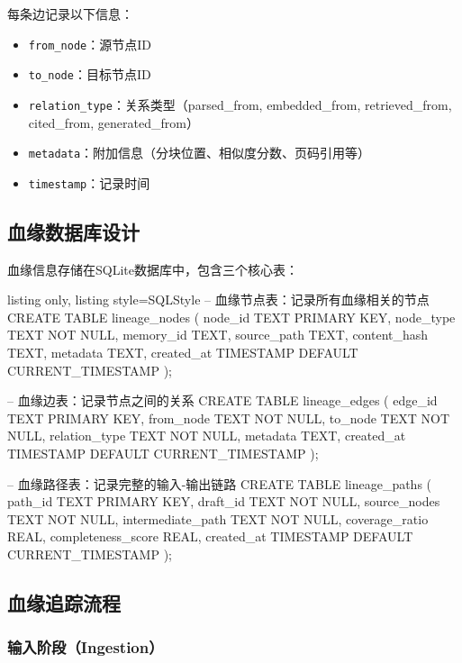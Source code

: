 \documentclass[12pt,a4paper,oneside]{article}
\newcommand{\code}[1]{\texttt{#1}}
\begin{document}
每条边记录以下信息：
\begin{itemize}
    \item \code{from\_node}：源节点ID
    \item \code{to\_node}：目标节点ID
    \item \code{relation\_type}：关系类型（parsed\_from, embedded\_from, retrieved\_from, cited\_from, generated\_from）
    \item \code{metadata}：附加信息（分块位置、相似度分数、页码引用等）
    \item \code{timestamp}：记录时间
\end{itemize}

\subsection{血缘数据库设计}

血缘信息存储在SQLite数据库中，包含三个核心表：

\begin{tcblisting}{listing only, listing style=SQLStyle}
-- 血缘节点表：记录所有血缘相关的节点
CREATE TABLE lineage_nodes (
    node_id TEXT PRIMARY KEY,
    node_type TEXT NOT NULL,
    memory_id TEXT,
    source_path TEXT,
    content_hash TEXT,
    metadata TEXT,
    created_at TIMESTAMP DEFAULT CURRENT_TIMESTAMP
);

-- 血缘边表：记录节点之间的关系
CREATE TABLE lineage_edges (
    edge_id TEXT PRIMARY KEY,
    from_node TEXT NOT NULL,
    to_node TEXT NOT NULL,
    relation_type TEXT NOT NULL,
    metadata TEXT,
    created_at TIMESTAMP DEFAULT CURRENT_TIMESTAMP
);

-- 血缘路径表：记录完整的输入-输出链路
CREATE TABLE lineage_paths (
    path_id TEXT PRIMARY KEY,
    draft_id TEXT NOT NULL,
    source_nodes TEXT NOT NULL,
    intermediate_path TEXT NOT NULL,
    coverage_ratio REAL,
    completeness_score REAL,
    created_at TIMESTAMP DEFAULT CURRENT_TIMESTAMP
);
\end{tcblisting}

\subsection{血缘追踪流程}

\subsubsection{输入阶段（Ingestion）}
\end{document}
